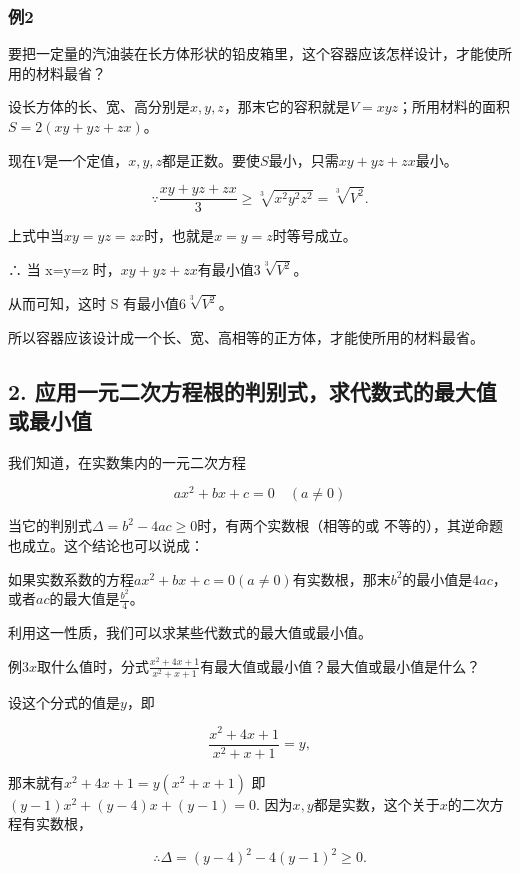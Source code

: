 \subsubsection{例2}

要把一定量的汽油装在长方体形状的铅皮箱里，这个容器应该怎样设计，才能使所用的材料最省？

设长方体的长、宽、高分别是\(x, y, z\)，那末它的容积就是\(V = xyz\)；所用材料的面积\(S = 2(xy + yz + zx)\)。

现在\(V\)是一个定值，\(x, y, z\)都是正数。要使\(S\)最小，只需\(xy + yz + zx\)最小。

\[
\because \frac{x y + y z + z x}{3} \geqslant \sqrt[3]{x^2y^2z^2} = \sqrt[3]{V^{2}}.
\]

上式中当\(xy = yz = zx\)时，也就是\(x = y = z\)时等号成立。

∴ 当 x=y=z 时，\(xy+yz+zx\)有最小值\(3\sqrt[3]{V^{2}}\)。

从而可知，这时 S 有最小值\(6\sqrt[3]{V^{2}}\)。

所以容器应该设计成一个长、宽、高相等的正方体，才能使所用的材料最省。

\subsection{2. 应用一元二次方程根的判别式，求代数式的最大值或最小值}

我们知道，在实数集内的一元二次方程

\[
ax^2+bx+c=0 \quad (a \neq 0)
\]

当它的判别式\(\Delta=b^{2}-4ac\geqslant0\)时，有两个实数根（相等的或
不等的），其逆命题也成立。这个结论也可以说成：

如果实数系数的方程\(ax^2 + bx + c = 0 (a \neq 0)\)有实数根，那末\(b^2\)的最小值是\(4ac\)，或者\(ac\)的最大值是\(\frac{b^2}{4}\)。

利用这一性质，我们可以求某些代数式的最大值或最小值。

例3\(x\)取什么值时，分式\(\frac{x^2 + 4x + 1}{x^2 + x + 1}\)有最大值或最小值？最大值或最小值是什么？

 设这个分式的值是\(y\)，即

\[
\frac{x^{2} + 4 x + 1}{x^{2} + x + 1} = y,
\]

那末就有\(x^{2} + 4x + 1 = y(x^{2} + x + 1)\)
即\((y - 1)x^{2} + (y - 4)x + (y - 1) = 0.\)
因为\(x, y\)都是实数，这个关于\(x\)的二次方程有实数根，

\[
\therefore \Delta = (y - 4)^{2} - 4 (y - 1)^{2} \geqslant 0.
\]

